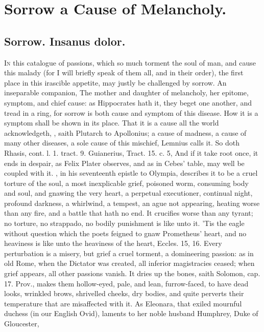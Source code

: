 {%
\section{Sorrow a Cause of Melancholy.}

\subsection{Sorrow. Insanus dolor.}
\lettrine{I}{n} this catalogue of passions, which so much torment the soul of man, and cause
this malady (for I will briefly speak of them all, and in their order), the
first place in this irascible appetite, may justly be challenged by sorrow. An
inseparable companion, The mother and daughter of melancholy,
her epitome, symptom, and chief cause: as Hippocrates hath it, they beget one
another, and tread in a ring, for sorrow is both cause and symptom of this
disease. How it is a symptom shall be shown in its place.
That it is a cause all the world acknowledgeth, , saith Plutarch to Apollonius; a
cause of madness, a cause of many other diseases, a sole cause of this
mischief, Lemnius calls it. So doth Rhasis, cont. l. 1. tract. 9.
Guianerius, Tract. 15. c. 5, And if it take root once, it ends in
despair, as Felix Plater observes, and as in Cebes' table,
may well be coupled with it. \Chrysostom{}, in his seventeenth
epistle to Olympia, describes it to be a cruel torture of the soul, a
most inexplicable grief, poisoned worm, consuming body and soul, and
gnawing the very heart, a perpetual executioner, continual night,
profound darkness, a whirlwind, a tempest, an ague not appearing,
heating worse than any fire, and a battle that hath no end. It
crucifies worse than any tyrant; no torture, no strappado, no bodily
punishment is like unto it. 'Tis the eagle without question which the
poets feigned to gnaw Prometheus' heart, and no heaviness is like
unto the heaviness of the heart, Eccles.  15, 16. Every
perturbation is a misery, but grief a cruel torment, a domineering
passion: as in old Rome, when the Dictator was created, all inferior
magistracies ceased; when grief appears, all other passions vanish. It
dries up the bones, saith Solomon, cap. 17. Prov., makes them
hollow-eyed, pale, and lean, furrow-faced, to have dead looks, wrinkled
brows, shrivelled cheeks, dry bodies, and quite perverts their
temperature that are misaffected with it. As Eleonara, that exiled
mournful duchess (in our English Ovid), laments to her noble
husband Humphrey, Duke of Gloucester,

}
